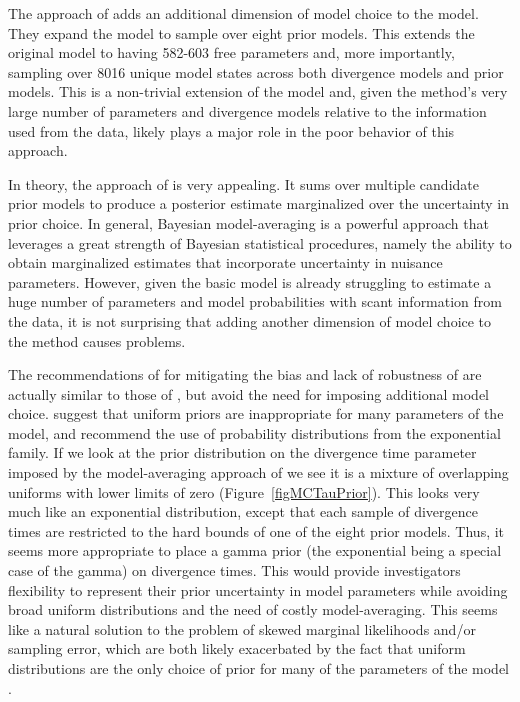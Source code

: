 \documentclass[letterpaper,12pt]{article}
\begin{document}
\begin{linenumbers}
The approach of \citet{Hickerson2013} adds an additional dimension of model
choice to the model. They expand the model to sample over eight prior models.
This extends the original model to having 582-603 free parameters and, more
importantly, sampling over 8016 unique model states across both divergence
models and prior models.
This is a non-trivial extension of the model and, given the method's very large
number of parameters and divergence models relative to the information used
from the data, likely plays a major role in the poor behavior of this approach.

In theory, the approach of \citet{Hickerson2013} is very appealing.  It sums
over multiple candidate prior models to produce a posterior estimate
marginalized over the uncertainty in prior choice.
In general, Bayesian model-averaging is a powerful approach that leverages a
great strength of Bayesian statistical procedures, namely the ability to
obtain marginalized estimates that incorporate uncertainty in nuisance
parameters.
However, given the basic \msb model is already struggling to estimate
a huge number of parameters and model probabilities with scant information
from the data, it is not surprising that adding another dimension of
model choice to the method causes problems.

The recommendations of \citet{Oaks2012} for mitigating the bias and lack of
robustness of \msb are actually similar to those of \citet{Hickerson2013}, but
avoid the need for imposing additional model choice.
\citet{Oaks2012} suggest that uniform priors are inappropriate for many
parameters of the \msb model, and recommend the use of probability
distributions from the exponential family.
If we look at the prior distribution on the divergence time parameter \divt{}
imposed by the model-averaging approach of \citet{Hickerson2013} we see
it is a mixture of overlapping uniforms with lower limits of zero
(Figure~\ref{figMCTauPrior}).
This looks very much like an exponential distribution, except that each sample
of divergence times are restricted to the hard bounds of one of the eight prior
models.
Thus, it seems more appropriate to place a gamma prior (the exponential being a
special case of the gamma) on divergence times.
This would provide investigators flexibility to represent their prior
uncertainty in model parameters while avoiding broad uniform
distributions and the need of costly model-averaging.
This seems like a natural solution to the problem of skewed marginal
likelihoods and/or sampling error, which are both likely exacerbated by the
fact that uniform distributions are the only choice of prior for many of the
parameters of the \msb model \citep[\divt{}, \ancestralTheta{},
, , \bottleTime{},
, , \locusRateHetShapeParameter,
\migrationRate{}, \recombinationRate;][]{Oaks2012}.


\end{linenumbers}
\end{document}
